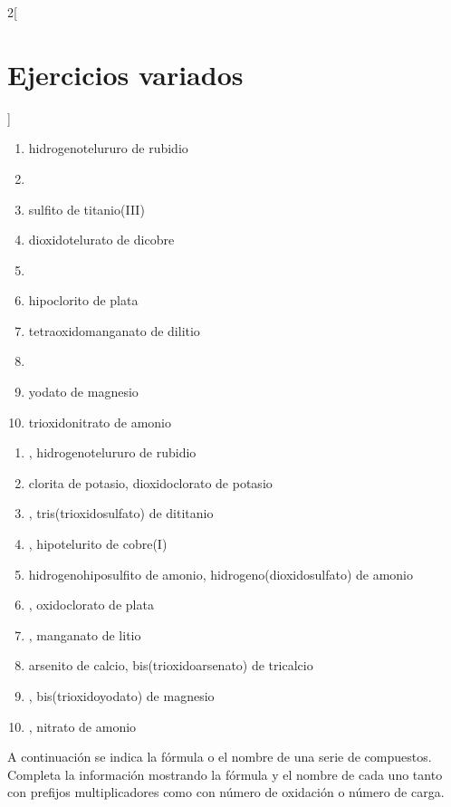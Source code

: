 \documentclass[10pt]{article}
\begin{document}
\begin{multicols*}{2}[
  \section{Ejercicios variados}
  ]
\begin{exercise}[
    tags    = {inorgánica,sales,sales binarias,sales ternarias},
    topics  = {química inorgánica,formulación,nomenclatura},
    source  = {SAN Formulación, p29, e39},
  ]
  \begin{enumerate}
    \item hidrogenotelururo de rubidio
    \item {}
    \item sulfito de titanio(III)
    \item dioxidotelurato de dicobre
    \item {}
    \item hipoclorito de plata
    \item tetraoxidomanganato de dilitio
    \item {}
    \item yodato de magnesio
    \item trioxidonitrato de amonio
  \end{enumerate}
\end{exercise}

\begin{solution}
  \begin{enumerate}
    \item {}, hidrogenotelururo de rubidio
    \item clorita de potasio, dioxidoclorato de potasio
    \item {}, tris(trioxidosulfato) de dititanio
    \item {}, hipotelurito de cobre(I)
    \item hidrogenohiposulfito de amonio, hidrogeno(dioxidosulfato) de amonio
    \item {}, oxidoclorato de plata
    \item {}, manganato de litio
    \item arsenito de calcio, bis(trioxidoarsenato) de tricalcio
    \item {}, bis(trioxidoyodato) de magnesio
    \item {}, nitrato de amonio
  \end{enumerate}
\end{solution}




\begin{exercise}[
    tags    = {inorgánica,óxidos,compuestos binarios,2B},
    topics  = {química inorgánica,formulación,nomenclatura},
    source  = {Química 2B OXF 2016, p342, e5},
  ]
  A continuación se indica la fórmula o el nombre de una serie de compuestos. Completa la información mostrando la fórmula y el nombre de cada uno tanto con prefijos multiplicadores como con número de oxidación o número de carga.


\end{exercise}
\end{multicols*}
\end{document}
